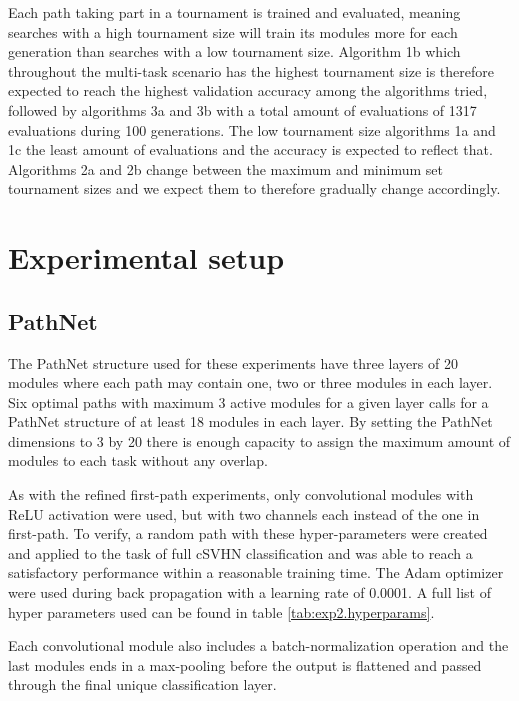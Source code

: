 Each path taking part in a tournament is trained and evaluated, meaning searches with a high tournament size will train its modules more for each generation than searches with a low tournament size. Algorithm 1b which throughout the multi-task scenario has the highest tournament size is therefore expected to reach the highest validation accuracy among the algorithms tried, followed by algorithms 3a and 3b with a total amount of evaluations of 1317 evaluations during 100 generations. The low tournament size algorithms 1a and 1c the least amount of evaluations and the accuracy is expected to reflect that. Algorithms 2a and 2b change between the maximum and minimum set tournament sizes and we expect them to therefore gradually change accordingly.

\section{Experimental setup}
\label{exp2:implementation}

\subsection{PathNet}
The PathNet structure used for these experiments have three layers of 20 modules where each path may contain one, two or three modules in each layer. Six optimal paths with maximum 3 active modules for a given layer calls for a PathNet structure of at least 18 modules in each layer. By setting the PathNet dimensions to 3 by 20 there is enough capacity to assign the maximum amount of modules to each task without any overlap.



As with the refined first-path experiments, only convolutional modules with ReLU activation were used, but with two channels each instead of the one in first-path. To verify, a random path with these hyper-parameters were created and applied to the task of full cSVHN classification and was able to reach a satisfactory performance within a reasonable training time. The Adam optimizer were used during back propagation with a learning rate of 0.0001. A full list of hyper parameters used can be found in table \ref{tab:exp2.hyperparams}. 

Each convolutional module also includes a batch-normalization operation and the last modules ends in a max-pooling before the output is flattened and passed through the final unique classification layer. 


